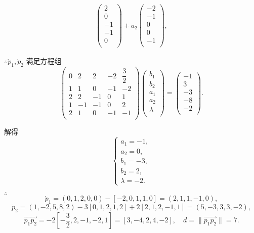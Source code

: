 \documentclass[color=black,device=normal,lang=cn,mode=geye]{elegantnote}
\begin{document}
\begin{solution}
\begin{align*}
\begin{pmatrix}
            2 \\
            0 \\
            -1 \\
            -1 \\
            0 \\
        \end{pmatrix}+a_2\begin{pmatrix}
            -2 \\
            -1 \\
            0 \\
            0 \\
            -1 \\
        \end{pmatrix},
    \end{align*}

    $\therefore\dot{p}_1,\dot{p}_2$ 满足方程组
    \[\begin{pmatrix}
        0 & 2  & 2  & -2 & \dfrac{3}{2} \\
        1 & 1  & 0  & -1 & -2 \\
        2 & 2  & -1 & 0  & 1 \\
        1 & -1 & -1 & 0  & 2 \\
        2 & 1  & 0  & -1 & -1 \\
    \end{pmatrix}\begin{pmatrix}
        b_1 \\
        b_2 \\
        a_1 \\
        a_2 \\
        \lambda \\
    \end{pmatrix}=\begin{pmatrix}
        -1 \\
        3 \\
        -3 \\
        -8 \\
        -2 \\
    \end{pmatrix}.\]

    解得
    \[\begin{cases}
        a_1=-1, \\
        a_2=0, \\
        b_1=-3, \\
        b_2=2, \\
        \lambda=-2.
    \end{cases}\]

    $\therefore$
    \[\dot{p}_1=(0,1,2,0,0)-[-2,0,1,1,0]=(2,1,1,-1,0),\]
    \[\dot{p}_2=(1,-2,5,8,2)-3[0,1,2,1,2]+2[2,1,2,-1,1]=(5,-3,3,3,-2),\]
    \[\overrightarrow{p_1p_2}=-2\left[-\dfrac{3}{2},2,-1,-2,1\right]=[3,-4,2,4,-2],\quad d=\|\overrightarrow{p_1p_2}\|=7.\]
\end{solution}
\end{document}
